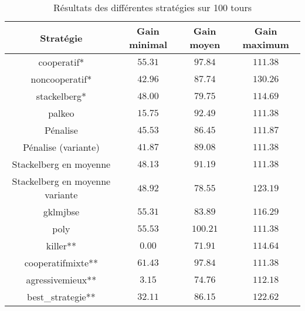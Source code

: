\documentclass{scrartcl}
\begin{document}
    \begin{table}[f]
      \centering
      \begin{tabular}{|c||c|c|c|}
        \hline
        Stratégie      & Gain minimal & Gain moyen & Gain maximum \\\hline\hline
           cooperatif* & $ 55.31$ & $ 97.84$ & $111.38$ \\\hline
        noncooperatif* & $ 42.96$ & $ 87.74$ & $130.26$ \\\hline
          stackelberg* & $ 48.00$ & $ 79.75$ & $114.69$ \\\hline
                palkeo & $ 15.75$ & $ 92.49$ & $111.38$ \\\hline
              Pénalise & $ 45.53$ & $ 86.45$ & $111.87$ \\\hline
     Pénalise (variante)& $ 41.87$ & $ 89.08$ & $111.38$ \\\hline
Stackelberg en moyenne & $ 48.13$ & $ 91.19$ & $111.38$ \\\hline
Stackelberg en moyenne variante & $ 48.92$ & $ 78.55$ & $123.19$ \\\hline
              gklmjbse & $ 55.31$ & $ 83.89$ & $116.29$ \\\hline
                  poly & $ 55.53$ & $100.21$ & $111.38$ \\\hline
              killer** & $  0.00$ & $ 71.91$ & $114.64$ \\\hline
     cooperatifmixte** & $ 61.43$ & $ 97.84$ & $111.38$ \\\hline
      agressivemieux** & $  3.15$ & $ 74.76$ & $112.18$ \\\hline
     best\_strategie** & $ 32.11$ & $ 86.15$ & $122.62$ \\\hline
      \end{tabular}
      \caption{Résultats des différentes stratégies sur 100 tours}
      \label{table:coop_results}
    \end{table}
\end{document}
